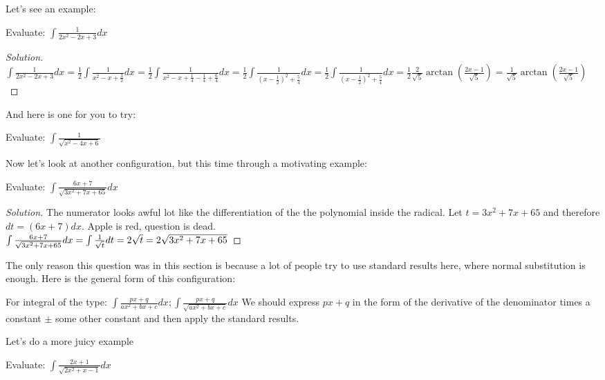 Let's see an example:\\
\begin{example}
    Evaluate: $\int \frac{1}{2x^2-2x+3} dx$
\end{example}
\begin{proof}
    [Solution]
    $
    \int \frac{1}{2x^2-2x+3} dx
    = \frac{1}{2} \int \frac{1}{x^2-x+\frac{3}{2}} dx
    = \frac{1}{2} \int \frac{1}{x^2-x+\frac{1}{4}-\frac{1}{4}+\frac{6}{4}} dx
    = \frac{1}{2} \int \frac{1}{(x-\frac{1}{2})^2+\frac{5}{4}} dx
    = \frac{1}{2} \int \frac{1}{(x-\frac{1}{2})^2+\frac{5}{4}} dx
    =\frac{1}{2} \frac{2}{\sqrt{5}} \arctan(\frac{2x-1}{\sqrt{5}})
    =\frac{1}{\sqrt{5}} \arctan(\frac{2x-1}{\sqrt{5}})
    $
\end{proof}
And here is one for you to try:\\
\begin{example}
    Evaluate: $\int \frac{1}{\sqrt{x^2-4x+6}}$
\end{example}
Now let's look at another configuration, but this time through a motivating example:\\
\begin{example}
    Evaluate: $\int \frac{6x+7}{\sqrt{3x^2+7x+65}}dx$
\end{example}
\begin{proof}
    [Solution]
    The numerator looks awful lot like the differentiation of the the polynomial inside the radical. Let $t=3x^2+7x+65$ and therefore $dt=(6x+7)dx$. Apple is red, question is dead.\\
    $
    \int \frac{6x+7}{\sqrt{3x^2+7x+65}}dx\\
    = \int \frac{1}{\sqrt{t}}dt\\
    = 2\sqrt{t}\\
    = 2\sqrt{3x^2+7x+65}
    $
\end{proof}
The only reason this question was in this section is because a lot of people try to use standard results here, where normal substitution is enough. Here is the general form of this configuration:\\
\begin{theorem}
    For integral of the type: $\int \frac{px+q}{ax^2+bx+c} dx; \int \frac{px+q}{\sqrt{ax^2+bx+c}} dx $
    We should express $px+q$ in the form of the derivative of the denominator times a constant $\pm$ some other constant and then apply the standard results.\\
\end{theorem}
Let's do a more juicy example
\begin{example}
    Evaluate: $\int \frac{2x+1}{\sqrt{2x^2+x-1}} dx$
\end{example}
